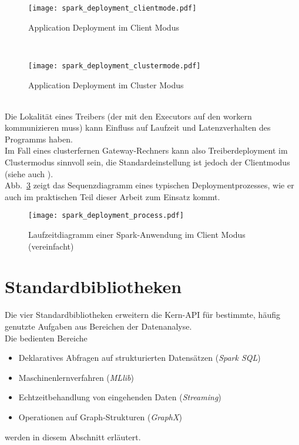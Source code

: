 \begin{figure}[ht!]
	\centering
  \texttt{[image: spark\_deployment\_clientmode.pdf]}
	\caption{Application Deployment im Client Modus}
	\label{fig:spark_deployment_clientmode}
\end{figure}\\

\begin{figure}[ht!]
	\centering
  \texttt{[image: spark\_deployment\_clustermode.pdf]}
	\caption{Application Deployment im Cluster Modus}
	\label{fig:spark_deployment_clustermode}
\end{figure}\\

Die Lokalität eines Treibers (der mit den Executors auf den \gls{worker}n kommunizieren muss) kann Einfluss auf Laufzeit und Latenzverhalten des Programms haben.\\

Im Fall eines clusterfernen Gateway-Rechners kann also Treiberdeployment im Clustermodus sinnvoll sein, die Standardeinstellung ist jedoch der Clientmodus (siehe auch \cite{spark_submission}).\\

Abb.~\ref{fig:app_deployment_process} zeigt das Sequenzdiagramm eines typischen Deploymentprozesses, wie er auch im praktischen Teil dieser Arbeit zum Einsatz kommt.

\begin{figure}[ht!]
	\centering
  \texttt{[image: spark\_deployment\_process.pdf]}
	\caption{Laufzeitdiagramm einer Spark-Anwendung im Client Modus (vereinfacht)}
	\label{fig:app_deployment_process}
\end{figure}

\section{Standardbibliotheken}
Die vier Standardbibliotheken erweitern die Kern-API für bestimmte, häufig genutzte Aufgaben aus Bereichen der Datenanalyse.\\

Die bedienten Bereiche
\begin{itemize}
	\item Deklaratives Abfragen auf strukturierten Datensätzen (\textit{Spark SQL})
	\item Maschinenlernverfahren (\textit{MLlib})
	\item Echtzeitbehandlung von eingehenden Daten (\textit{Streaming})
	\item Operationen auf Graph-Strukturen (\textit{GraphX})
\end{itemize}
werden in diesem Abschnitt erläutert.

